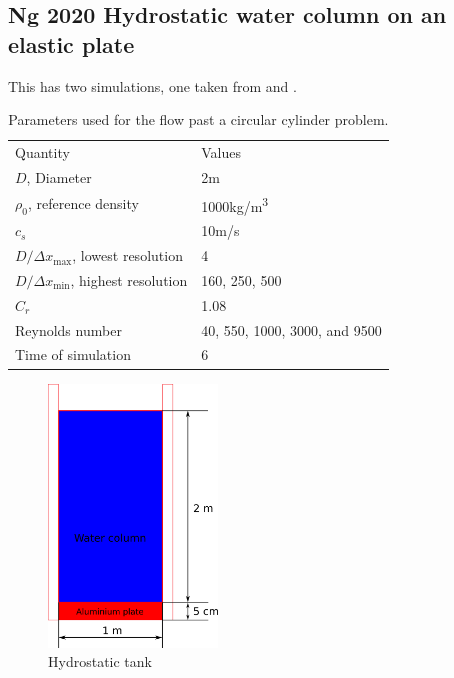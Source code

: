 \documentclass[preprint,12pt]{elsarticle}
\begin{document}
\subsection{Ng 2020 Hydrostatic water column on an elastic plate}
\label{sec:hydrostatic-water-column-on-an-composite-elastic-plate}

This has two simulations, one taken from \cite{ng2020coupled} and \cite{khayyer2021coupled}.
\begin{table}[!ht]
  \centering
  \begin{tabular}[!ht]{ll}
    Quantity & Values \\
    $D$, Diameter & 2m \\
    $\rho_0$, reference density & 1000kg/m\textsuperscript{3} \\
    $c_s$ & 10m/s \\
    $D/\Delta x_{\max}$, lowest resolution & 4 \\
    $D/\Delta x_{\min} $, highest resolution & 160, 250, 500\\
    $C_r$ & 1.08 \\
    Reynolds number & 40, 550, 1000, 3000, and 9500 \\
    Time of simulation & 6 \\
  \end{tabular}
  \caption{Parameters used for the flow past a circular cylinder problem.}%
  \label{tab:fpc-params}
\end{table}
%
%
%
\begin{figure}[!htpb]
  \centering
  \includegraphics[width=0.4\textwidth]{images/hydrostatic_water_column_on_an_elastic_plate/hydrostatic_water_column_on_an_elastic_plate}
  \caption{Hydrostatic tank}
\label{fig:hs-water-on-plate}
\end{figure}
%
%
\end{document}

